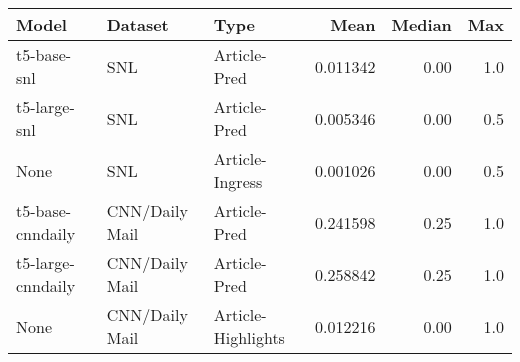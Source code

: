 \begin{tabular}{lllrrr}
\toprule
            Model &        Dataset &               Type &     Mean &  Median &  Max \\
\midrule
      t5-base-snl &            SNL &       Article-Pred & 0.011342 &    0.00 &  1.0 \\
     t5-large-snl &            SNL &       Article-Pred & 0.005346 &    0.00 &  0.5 \\
             None &            SNL &    Article-Ingress & 0.001026 &    0.00 &  0.5 \\
 t5-base-cnndaily & CNN/Daily Mail &       Article-Pred & 0.241598 &    0.25 &  1.0 \\
t5-large-cnndaily & CNN/Daily Mail &       Article-Pred & 0.258842 &    0.25 &  1.0 \\
             None & CNN/Daily Mail & Article-Highlights & 0.012216 &    0.00 &  1.0 \\
\bottomrule
\end{tabular}

